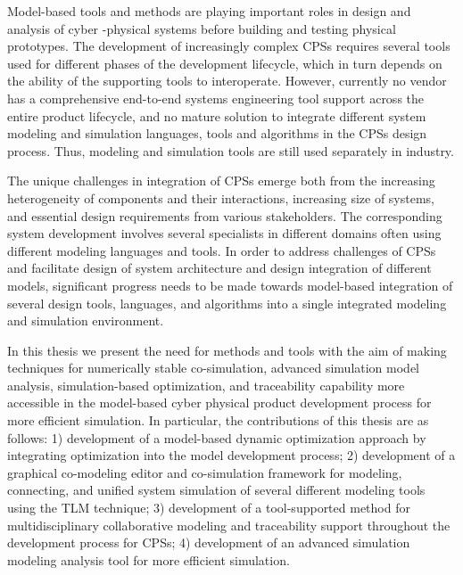 
Model-based tools and methods are playing important roles in design and analysis of cyber -physical systems before building and testing physical prototypes. The development of increasingly complex CPSs requires several tools used for different phases of the development lifecycle, which in turn depends on the ability of the supporting tools to interoperate. However, currently no vendor has a comprehensive end-to-end systems engineering tool support across the entire product lifecycle, and no mature solution to integrate different system modeling and simulation languages, tools and algorithms in the CPSs design process. Thus, modeling and simulation tools are still used separately in industry. 

The unique challenges in integration of CPSs emerge both from the increasing heterogeneity of components and their interactions, increasing size of systems, and essential design requirements from various stakeholders. The corresponding system development involves several specialists in different domains often using different modeling languages and tools. In order to address challenges of CPSs and facilitate design of system architecture and design integration of different models, significant progress needs to be made towards model-based integration of several design tools, languages, and algorithms into a single integrated modeling and simulation environment. 

In this thesis we present the need for methods and tools with the aim of making techniques for numerically stable co-simulation, advanced simulation model analysis, simulation-based optimization, and traceability capability more accessible in the model-based cyber physical product development process for more efficient simulation. In particular, the contributions of this thesis are as follows: 1) development of a model-based dynamic optimization approach by integrating optimization into the model development process; 2) development of a graphical co-modeling editor and co-simulation framework for modeling, connecting, and unified system simulation of several different modeling tools using the TLM technique; 3) development of a tool-supported method for multidisciplinary collaborative modeling and traceability support throughout the development process for CPSs; 4) development of an advanced simulation modeling analysis tool for more efficient simulation.




